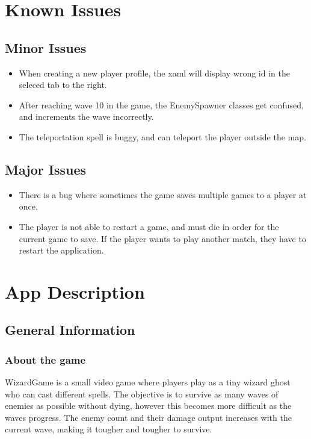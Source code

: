 \documentclass[12pt]{article}
\begin{document}
\section{Known Issues}

    \subsection{Minor Issues}

    \begin{itemize}
        \item When creating a new player profile, the xaml will display wrong id in the seleced tab to the right.
        \item After reaching wave 10 in the game, the EnemySpawner classes get confused, and increments the wave incorrectly.
        \item The teleportation spell is buggy, and can teleport the player outside the map.
    \end{itemize}

    \subsection{Major Issues}

    \begin{itemize}
        \item There is a bug where sometimes the game saves multiple games to a player at once.
        \item The player is not able to restart a game, and must die in order for the current game to save. If the player wants to play another match, they have to restart the application.
    \end{itemize}

\section{App Description}

    \subsection{General Information}

        \subsubsection{About the game}

        WizardGame is a small video game where players play as a tiny wizard ghost who can cast different spells. The objective is to survive as many waves of enemies as possible without dying, however this becomes more difficult as the waves progress. The enemy count and their damage output increases with the current wave, making it tougher and tougher to survive. 
        
\end{document}
